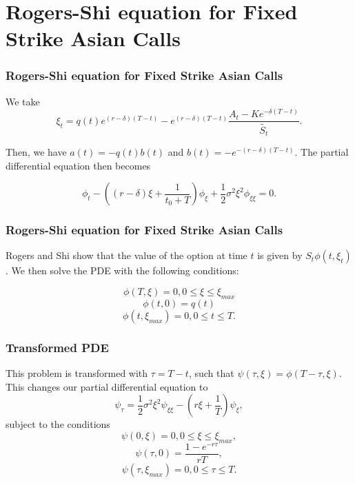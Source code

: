 \documentclass{beamer}
\begin{document}
  \section{Rogers-Shi equation for Fixed Strike Asian Calls}

  \begin{frame}
    \frametitle{Rogers-Shi equation for Fixed Strike Asian Calls}
    We take
    \begin{equation}
      \xi_t = q(t)e^{(r-\delta)(T-t)} - e^{(r-\delta)(T-t)}\frac{A_t - Ke^{-\delta(T-t)}}{\tilde{S_t}}.
    \end{equation}

    Then, we have \( a(t) = -q(t)b(t) \) and \(b(t) = -e^{-(r-\delta)(T-t)}\). The partial differential equation then becomes

    \begin{equation}
      \phi_t - ( (r-\delta)\xi + \frac{1}{t_0 + T} ) \phi_\xi + \frac{1}{2}\sigma^2\xi^2\phi_{\xi\xi} = 0.
    \end{equation}
  \end{frame}

  \begin{frame}
    \frametitle{Rogers-Shi equation for Fixed Strike Asian Calls}
    Rogers and Shi show that the value of the option at time \(t\) is given by \(S_t\phi(t, \xi_t)\). We then solve the PDE with the following conditions:

    \begin{equation}
      \phi(T, \xi) = 0, 0 \le \xi \le \xi_{max}
    \end{equation}
    \begin{equation}
      \phi(t, 0) = q(t)
    \end{equation}
    \begin{equation}
      \phi(t, \xi_{max}) = 0, 0 \le t \le T.
    \end{equation}
  \end{frame}

  \begin{frame}
    \frametitle{Transformed PDE}
    This problem is transformed with \(\tau = T - t \), such that \(\psi(\tau, \xi) = \phi(T-\tau, \xi)\). This changes our partial differential equation to
    \begin{equation}
      \psi_\tau = \frac{1}{2}\sigma^2\xi^2\psi_{\xi\xi} - (r\xi + \frac{1}{T})\psi_\xi,
    \end{equation}
    subject to the conditions
    \begin{equation}
      \psi(0, \xi) = 0, 0 \le \xi \le \xi_{max},
    \end{equation}
    \begin{equation}
      \psi(\tau, 0) = \frac{1-e^{-r\tau}}{rT},
    \end{equation}
    \begin{equation}
      \psi(\tau, \xi_{max}) = 0, 0 \le \tau \le T.
    \end{equation}
  \end{frame}
\end{document}
